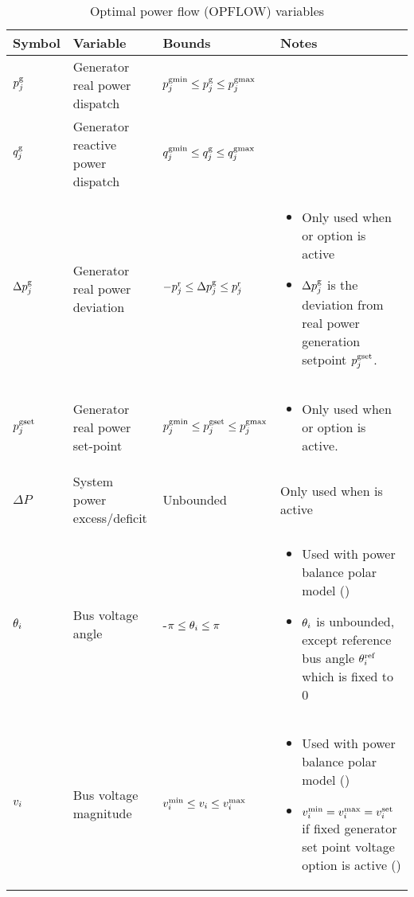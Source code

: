 \begin{table}[!htbp]
\caption{Optimal power flow (OPFLOW) variables}
\small
  \begin{tabular}{|p{}|p{}|p{}|p{}|}
   \hline
    \textbf{Symbol} & \textbf{Variable} & \textbf{Bounds} & \textbf{Notes} \\
    \hline
    $p^\text{g}_j$ & Generator real power dispatch & $p^\text{gmin}_j \le p^\text{g}_j \le p^\text{gmax}_j$ & ~\\
    \hline
    $q^\text{g}_j$ & Generator reactive power dispatch & $q^\text{gmin}_j \le q^\text{g}_j \le q^\text{gmax}_j$ & ~ \\
    \hline
    $\Delta{p}^\text{g}_j$ & Generator real power deviation & $-p^{\text{r}}_j \le \Delta{p}^\text{g}_j \le p^{\text{r}}_j$ & \begin{itemize}[noitemsep,topsep=0pt,leftmargin=*]  \item Only used when \option{\opflowgensetpoint} or \option{\opflowuseagc} option is active \item $\Delta{p}^\text{g}_j$ is the deviation from real power generation setpoint $p^{\text{gset}}_j$.\end{itemize} \\
    \hline
    $p^{\text{gset}}_j$ & Generator real power set-point & $p^\text{gmin}_j \le p^{\text{gset}}_j \le p^\text{gmax}_j$ & \begin{itemize}[noitemsep,topsep=0pt,leftmargin=*] \item Only used when \option{\opflowgensetpoint} or \option{\opflowuseagc} option is active. \end{itemize} \\
    \hline
    $\Delta{P}$ & System power excess/deficit & Unbounded & Only used when \option{\opflowuseagc} is active \\
    \hline
    $\theta_i$ & Bus voltage angle & -$\pi \le \theta_i \le \pi$ & 
    \begin{itemize}[noitemsep,topsep=0pt,leftmargin=*] 
        \item Used with power balance polar model (\option{\opflowmodel~\pbpol}) 
        \item $\theta_i$ is unbounded, except reference bus angle $\theta^\text{ref}_i$ which is fixed to 0 
    \end{itemize} \\
    \hline
    $v_i$ & Bus voltage magnitude & $v^\text{min}_i \le v_i \le v^\text{max}_i$ & \begin{itemize}[noitemsep,topsep=0pt,leftmargin=*] \item Used with power balance polar model (\option{\opflowmodel~\pbpol})\item $v^\text{min}_i = v^\text{max}_i = v^\text{set}_i$ if fixed generator set point voltage option is active (\option{\opflowgensetpoint}) \end{itemize} \\

\end{tabular}
\end{table}

